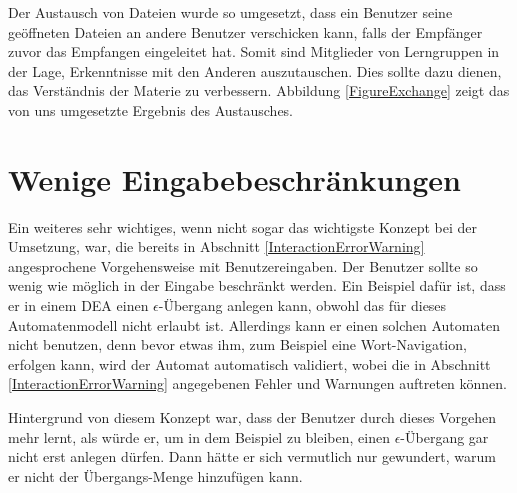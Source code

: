 Der Austausch von Dateien wurde so umgesetzt, dass ein Benutzer seine geöffneten
Dateien an andere Benutzer verschicken kann, falls der Empfänger zuvor das
Empfangen eingeleitet hat. Somit sind Mitglieder von Lerngruppen in der Lage,
Erkenntnisse mit den Anderen auszutauschen. Dies sollte dazu dienen, das
Verständnis der Materie zu verbessern. Abbildung \ref{FigureExchange} zeigt das
von uns umgesetzte Ergebnis des Austausches.\vspace{10pt}


\section{Wenige Eingabebeschränkungen}\label{ConceptsInput}

Ein weiteres sehr wichtiges, wenn nicht sogar das wichtigste Konzept bei der
Umsetzung, war, die bereits in Abschnitt \ref{InteractionErrorWarning}
angesprochene Vorgehensweise mit Benutzereingaben. Der Benutzer sollte so wenig wie möglich in
der Eingabe beschränkt werden. Ein Beispiel dafür ist, dass er in einem DEA einen
$\epsilon$-Übergang anlegen kann, obwohl das für dieses Automatenmodell nicht
erlaubt ist. Allerdings kann er einen solchen Automaten nicht benutzen, denn bevor etwas
ihm, zum Beispiel eine Wort-Navigation, erfolgen kann, wird der Automat
automatisch validiert, wobei die in Abschnitt \ref{InteractionErrorWarning}
angegebenen Fehler und Warnungen auftreten können.\vspace{10pt}

Hintergrund von diesem Konzept war, dass der Benutzer durch dieses Vorgehen mehr
lernt, als würde er, um in dem Beispiel zu bleiben, einen $\epsilon$-Übergang
gar nicht erst anlegen dürfen. Dann hätte er sich vermutlich nur gewundert,
warum er \Symbol{$\epsilon$} nicht der Übergangs-Menge hinzufügen
kann.\vspace{10pt}


